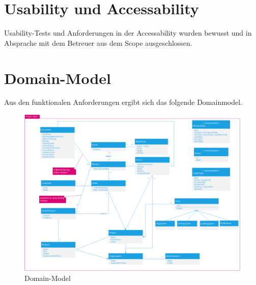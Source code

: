 \section{Usability und Accessability}

Usability-Tests und Anforderungen in der Accessability wurden bewusst und in Absprache mit dem Betreuer aus dem Scope ausgeschlossen.

\section{Domain-Model}
Aus den funktionalen Anforderungen ergibt sich das folgende Domainmodel.
\begin{landscape}
\begin{figure}[h]
	\includegraphics[width=0.75\paperheight]{images/domainmodell.png}
	\caption{Domain-Model}
	\label{fig:domain-model}
\end{figure}
\end{landscape}

